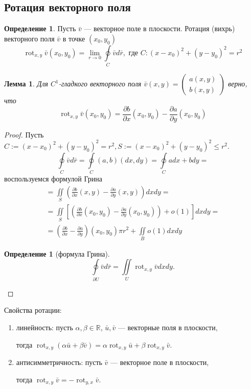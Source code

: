 \documentclass[a5paper]{article}
\newcounter{through}
\theoremstyle{plain}
\newtheorem{lemma}[through]{Лемма}
\theoremstyle{definition}
\newtheorem{definition}[through]{Определение}
\numberwithin{through}{section}
\numberwithin{equation}{section}
\DeclareMathOperator{\rot}{rot}
\begin{document}
\subsection{Ротация векторного поля}
\begin{definition}
Пусть $\bar{v}$ --- векторное поле в плоскости. 
Ротация (вихрь) векторного поля $\bar{v}$ в точке $(x_0, y_0)$ 
\[\rot_{x, y} \bar{v} (x_0, y_0) = 
\lim\limits_{r \to 0} \oint\limits_{C} \bar{v}d\bar{r}, \text{ где } C: (x-x_0)^2 + (y - y_0)^2 = r^2 \]
\end{definition}
\begin{lemma}
	Для $C^1$-гладкого векторного поля $\bar{v}(x,y) = 
	\begin{pmatrix}
	a(x,y) \\
	b(x,y)
	\end{pmatrix}$ верно, что 
	\[ \rot_{x, y} \bar{v}(x_0, y_0) = \frac{\partial b}{\partial x}(x_0, y_0) - \frac{\partial a}{\partial y}(x_0, y_0) \]
\end{lemma}
\begin{proof}
	Пусть $C := (x-x_0)^2 + (y - y_0)^2 = r^2, S:=(x-x_0)^2 + (y - y_0)^2 \leq r^2 $. 
	\begin{equation*}
		\oint\limits_C \bar{v}d\bar{r} = \oint\limits_C (a, b)(dx, dy) = \oint\limits_C adx + bdy = 
	\end{equation*}
	воспользуемся формулой Грина
	\begin{eqnarray}
		= \iint\limits_S \left( \frac{\partial b}{\partial x}(x, y) - \frac{\partial a}{\partial y}(x, y) \right)dxdy = \nonumber\\
		= \iint\limits_S \left[ \left( \frac{\partial b}{\partial x}(x_0, y_0) - \frac{\partial a}{\partial y}(x_0, y_0) \right) + o(1) \right]
		dxdy = \nonumber \\
		= \left( \frac{\partial b}{\partial x} - \frac{\partial a}{\partial y} \right)(x_0, y_0) \pi r^2 + \iint\limits_B o(1)dxdy
		\nonumber
	\end{eqnarray}  
	
	\begin{definition}[формула Грина]
		\begin{equation*}
			\oint\limits_{\partial U} \bar{v} d\bar{r} = \iint\limits_U \rot_{x,y} \bar{v} dxdy.
		\end{equation*}
	\end{definition}
\end{proof}

Свойства ротации:
\begin{enumerate}
	\item 
	линейность: пусть $\alpha, \beta \in \mathbb{R}$, $\bar{u}, \bar{v}$ --- векторные поля в плоскости,
	
	тогда
	 $\rot_{x, y} (\alpha\bar{u} + \beta\bar{v}) = \alpha\rot_{x,y} \bar{u} + \beta\rot_{x, y} \bar{v}$.
	
	\item 
	антисимметричность: пусть $\bar{v}$ --- векторное поле в плоскости,
	
	тогда $\rot_{x,y} \bar{v} = - \rot_{y, x} \bar{v}$.
	
\end{enumerate}


\end{document}
